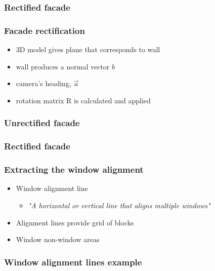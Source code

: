 \documentclass{beamer}
\begin{document}
\frame
{
	\frametitle{Rectified facade}
}

\frame
{
	\frametitle{Facade rectification}
	\begin{itemize}
		\item 3D model gives plane that corresponds to wall
		\item wall produces a normal vector $b$
		\item camera's heading, $\vec{a}$
		\item rotation matrix R is calculated and applied
	\end{itemize}
}


\frame
{
	\frametitle{Unrectified facade}
}

\frame
{
	\frametitle{Rectified facade}
}


\frame
{
}

\frame
{
}


\frame
{
	\frametitle{Extracting the window alignment}
	\begin{itemize}
	\item Window alignment line
	\begin{itemize}
		\item \emph{"A horizontal or vertical line that aligns multiple windows"}
	\end{itemize}
	\item Alignment lines provide grid of blocks
	\item Window non-window areas
	\end{itemize}
	
}


\frame
{
	\frametitle{Window alignment lines example}
}
\end{document}
